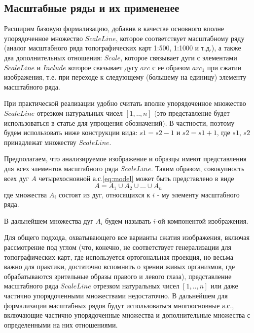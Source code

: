 \subsection{Масштабные ряды и их примененее}
Расширим базовую формализацию, добавив в качестве основного вполне упорядоченное множество $ScaleLine$, которое соответствует масштабному ряду (аналог масштабного ряда топографических карт 1:500,  1:1000 и т.д.), а также два дополнительных отношения: $Scale$,  которое связывает дуги с элементами $ScaleLine$ и $Include$ которое связывает дугу $arc$ с ее образом $arc_1$ при сжатии изображения, т.е. при переходе к следующему (большему на единицу) элементу масштабного ряда.

При практической реализации удобно считать  вполне упорядоченное множество $ScaleLine$ отрезком натуральных чисел $[1,.., n]$ (это представление будет использоваться в статье для упрощения обозначений). В частности, поэтому будем использовать ниже конструкции вида: $s1  = s2 - 1$ и $s2  = s1 + 1$, где $s1$, $s2$  принадлежат  множеству $ScaleLine$.

Предполагаем,  что анализируемое изображение и образцы имеют представления для всех элементов масштабного ряда $ScaleLine$. Таким образом, совокупность всех дуг $A$ четырехосновной а.с.\ref{eq:model} может быть представлено в виде
\begin{equation}
A = A_1 \cup A_2 \cup ... \cup A_n
\label{eq:components_set}
\end{equation}
где  множества $A_i$ состоят из дуг, относящихся к $i$ - му элементу масштабного ряда. 

\begin{definition}
В дальнейшем множества дуг $A_i$ будем называть $i$-ой компонентой изображения.
\end{definition}


\begin{remark}
Для общего подхода, охватывающего все варианты сжатия изображения, включая рассмотрение  под углом (что, конечно,  не соответствует генерализации для топографических карт, где используется ортогональная проекция,  но весьма важно для практики, достаточно  вспомнить о зрении живых организмов, где обрабатываются зрительные образы правого и левого глаза), представление масштабного ряда $ScaleLine$ отрезком натуральных чисел $[1,.., n]$ или даже частично  упорядоченными множествами недостаточно. В дальнейшем для формализации масштабных рядов  будут использоваться многоосновные а.с., включающие частично упорядоченные множества и дополнительные множества с определенными на них отношениями. 
\end{remark}

